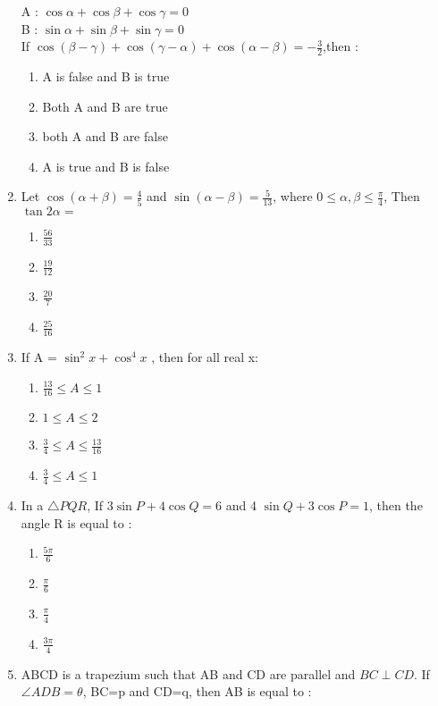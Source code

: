 \begin{enumerate}[label=\arabic*.,ref=\thesubsection.\theenumi]
    A : $\cos\alpha+\cos\beta+\cos\gamma = 0$\\
    B : $\sin\alpha+\sin\beta+\sin\gamma = 0$\\
    If $\cos(\beta-\gamma)+\cos(\gamma-\alpha)+\cos(\alpha-\beta) = {-\frac{3}{2}}$,then :
    \begin{enumerate}
        \item A is false and B is true
        \item Both A and B are true
        \item both A and B are false
        \item A is true and B is false
    \end{enumerate}
    \item Let $\cos(\alpha+\beta) = {\frac{4}{5}}$ and $\sin(\alpha-\beta) = {\frac{5}{13}}$, where $0\leq\alpha, \beta\leq{\frac{\pi}{4}}$, Then $\tan 2\alpha = $
    \begin{enumerate}
        \item ${\frac{56}{33}}$
        \item ${\frac{19}{12}}$
        \item ${\frac{20}{7}}$
        \item ${\frac{25}{16}}$
    \end{enumerate}
    \item If A = $\sin^2x+\cos^4 x$ , then for all real x:
    \begin{enumerate}
        \item ${\frac{13}{16}\leq A\leq 1}$
        \item $1\leq A\leq 2$
        \item $\frac{3}{4}\leq A\leq \frac{13}{16} $
        \item ${\frac{3}{4}\leq A\leq 1}$
    \end{enumerate}
    \item In a $\triangle PQR$, If $3 \sin P + 4 \cos Q = 6$ and 4 $\sin Q + 3 \cos P = 1$, then the angle R is equal to :
    \begin{enumerate}
        \item ${\frac{5\pi}{6}}$
        \item ${\frac{\pi}{6}}$
        \item ${\frac{\pi}{4}}$
        \item ${\frac{3\pi}{4}}$
    \end{enumerate}
    \item ABCD is a trapezium such that AB and CD are parallel and $BC\perp CD$. If $\angle ADB= \theta$, BC=p and CD=q, then AB is equal to :

\end{enumerate}
